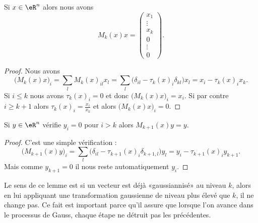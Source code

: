 \begin{lemma}
    Si \( x\in \eR^n\) alors nous avons 
    \begin{equation}
        M_k(x)x=\begin{pmatrix}
            x_1    \\ 
            \vdots    \\ 
            x_k    \\ 
            0    \\ 
            \vdots    \\ 
            0    
        \end{pmatrix}.
    \end{equation}
\end{lemma}

\begin{proof}
    Nous avons
    \begin{equation}
        \big( M_k(x)x \big)_i=\sum_lM_k(x)_{il}x_l=\sum_l\big( \delta_{il}-\tau_k(x)_i\delta_{kl} \big)x_l=x_i-\tau_k(x)_ix_k. 
    \end{equation}
    Si \( i\leq k\) nous avons \( \tau_k(x)_i=0\) et donc \(  \big( M_k(x)x \big)_i=x_i   \). Si par contre \( i\geq k+1\) alors \( \tau_k(x)_i=\frac{ x_i }{ x_k }\) et alors \( \big( M_k(x)x \big)_i=0\).
\end{proof}

\begin{lemma}       \label{LEMooPFWWooUmMsVH}
    Si \( y\in \eR^n\) vérifie \( y_i=0\) pour \( i>k\) alors \( M_{k+1}(x)y=y\).
\end{lemma}

\begin{proof}
    C'est une simple vérification :
    \begin{equation}
        \big( M_{k+1}(x)y \big)_i=\sum_l\big( \delta_{il}-\tau_{k+1}(x)_i\delta_{k+1,l} \big)y_l=y_i-\tau_{k+1}(x)_iy_{k+1}.
    \end{equation}
    Mais comme \( y_{k+1}=0\) il nous reste automatiquement \( y_i\).
\end{proof}
Le sens de ce lemme est si un vecteur est déjà «gaussiannisé» au niveau \( k\), alors en lui appliquant une transformation gaussienne de niveau plus élevé que \( k\), il ne change pas. Ce fait est important parce qu'il assure que lorsque l'on avance dans le processus de Gauss, chaque étape ne détruit pas les précédentes.

